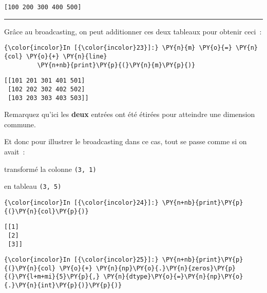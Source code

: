     \begin{Verbatim}[commandchars=\\\{\}]
[100 200 300 400 500]

    \end{Verbatim}

    \begin{center}\rule{0.5\linewidth}{\linethickness}\end{center}

    Grâce au broadcasting, on peut additionner ces deux tableaux pour
obtenir ceci~:

    \begin{Verbatim}[commandchars=\\\{\}]
{\color{incolor}In [{\color{incolor}23}]:} \PY{n}{m} \PY{o}{=} \PY{n}{col} \PY{o}{+} \PY{n}{line}
         \PY{n+nb}{print}\PY{p}{(}\PY{n}{m}\PY{p}{)}
\end{Verbatim}


    \begin{Verbatim}[commandchars=\\\{\}]
[[101 201 301 401 501]
 [102 202 302 402 502]
 [103 203 303 403 503]]

    \end{Verbatim}

    Remarquez qu'ici les \textbf{deux} entrées ont été étirées pour
atteindre une dimension commune.

    Et donc pour illustrer le broadcasting dans ce cas, tout se passe comme
si on avait~:

    transformé la colonne \texttt{(3,\ 1)}

    en tableau \texttt{(3,\ 5)}

    \begin{Verbatim}[commandchars=\\\{\}]
{\color{incolor}In [{\color{incolor}24}]:} \PY{n+nb}{print}\PY{p}{(}\PY{n}{col}\PY{p}{)}
\end{Verbatim}


    \begin{Verbatim}[commandchars=\\\{\}]
[[1]
 [2]
 [3]]

    \end{Verbatim}

    \begin{Verbatim}[commandchars=\\\{\}]
{\color{incolor}In [{\color{incolor}25}]:} \PY{n+nb}{print}\PY{p}{(}\PY{n}{col} \PY{o}{+} \PY{n}{np}\PY{o}{.}\PY{n}{zeros}\PY{p}{(}\PY{l+m+mi}{5}\PY{p}{,} \PY{n}{dtype}\PY{o}{=}\PY{n}{np}\PY{o}{.}\PY{n}{int}\PY{p}{)}\PY{p}{)}
\end{Verbatim}


